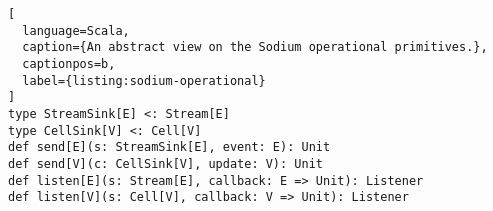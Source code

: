 \begin{lstlisting}[
  language=Scala,
  caption={An abstract view on the Sodium operational primitives.},
  captionpos=b,
  label={listing:sodium-operational}
]
type StreamSink[E] <: Stream[E]
type CellSink[V] <: Cell[V]
def send[E](s: StreamSink[E], event: E): Unit
def send[V](c: CellSink[V], update: V): Unit
def listen[E](s: Stream[E], callback: E => Unit): Listener
def listen[V](s: Cell[V], callback: V => Unit): Listener
\end{lstlisting}
